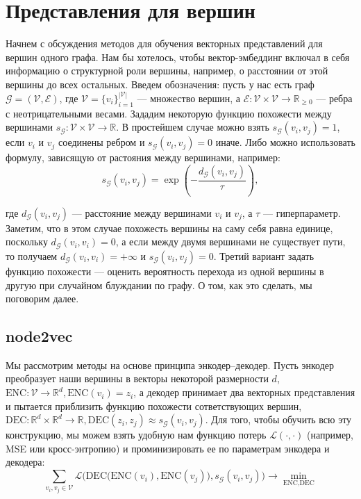 \documentclass[12pt,a4paper]{article}
\newcommand{\ENC}{\text{ENC}}
\newcommand{\DEC}{\text{DEC}}
\begin{document}
\section{Представления для вершин}

Начнем с обсуждения методов для обучения векторных представлений для вершин одного графа. Нам бы хотелось, чтобы вектор-эмбеддинг включал в себя информацию о структурной роли вершины, например, о расстоянии от этой вершины до всех остальных. Введем обозначения: пусть у нас есть граф $\mathcal{G} = (\mathcal{V}, \mathcal{E})$, где $\mathcal{V} = \{v_i\}_{i=1}^{|\mathcal{V}|}$ --- множество вершин, а $\mathcal{E}: \mathcal{V}\times\mathcal{V}\to\mathbb{R}_{\ge 0}$ --- ребра с неотрицательными весами. Зададим некоторую функцию похожести между вершинами $s_{\mathcal{G}}: \mathcal{V}\times\mathcal{V}\to\mathbb{R}$. В простейшем случае можно взять $s_{\mathcal{G}}(v_i, v_j)=1$, если $v_i$ и $v_j$ соединены ребром и $s_{\mathcal{G}}(v_i, v_j)=0$ иначе. Либо можно использовать формулу, зависящую от растояния между вершинами, например:
$$
s_{\mathcal{G}}(v_i, v_j) = \exp\left(-\frac{d_{\mathcal{G}}(v_i, v_j)}{\tau}\right),
$$

\noindent
где $d_{\mathcal{G}}(v_i, v_j)$ --- расстояние между вершинами $v_i$ и $v_j$, а $\tau$ --- гиперпараметр. Заметим, что в этом случае похожесть вершины на саму себя равна единице, поскольку $d_{\mathcal{G}}(v_i, v_i)=0$, а если между двумя вершинами не существует пути, то получаем $d_{\mathcal{G}}(v_i, v_i)=+\infty$ и $s_{\mathcal{G}}(v_i, v_j)=0$. Третий вариант задать функцию похожести --- оценить вероятность перехода из одной вершины в другую при случайном блуждании по графу. О том, как это сделать, мы поговорим далее.

\subsection{node2vec}

Мы рассмотрим методы на основе принципа энкодер--декодер. Пусть энкодер преобразует наши вершины в векторы некоторой размерности $d$, $\ENC: \mathcal{V} \to \mathbb{R}^d, \ENC(v_i)=z_i$, а декодер принимает два векторных представления и пытается приблизить функцию похожести сответствующих вершин, $\DEC: \mathbb{R}^d \times \mathbb{R}^d \to \mathbb{R}, \DEC(z_i, z_j)\approx s_{\mathcal{G}}(v_i, v_j)$. Для того, чтобы обучить всю эту конструкцию, мы можем взять удобную нам функцию потерь $\mathcal{L}(\cdot, \cdot)$ (например, MSE или кросс-энтропию) и проминизировать ее по параметрам энкодера и декодера:
$$
\sum_{v_i, v_j \in \mathcal{V}} \mathcal{L} \bigg(\DEC\Big(\ENC(v_i), \ENC(v_j)\Big), s_{\mathcal{G}}(v_i, v_j)\bigg) \to \min_{\ENC, \DEC}
$$
\end{document}
